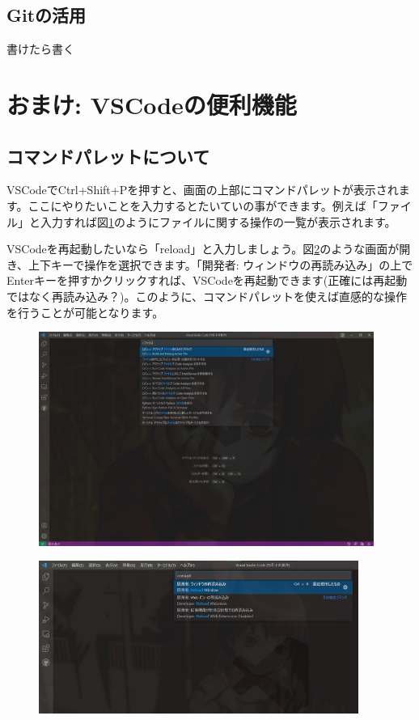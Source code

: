 \subsection{Gitの活用}
書けたら書く

\section{おまけ: VSCodeの便利機能}
\subsection{コマンドパレットについて}\label{ssec:cmp}
VSCodeでCtrl+Shift+Pを押すと、画面の上部にコマンドパレットが表示されます。ここにやりたいことを入力するとたいていの事ができます。例えば「ファイル」と入力すれば図\ref{fig:vscmp}のようにファイルに関する操作の一覧が表示されます。

VSCodeを再起動したいなら「reload」と入力しましょう。図\ref{fig:reload}のような画面が開き、上下キーで操作を選択できます。「開発者: ウィンドウの再読み込み」の上でEnterキーを押すかクリックすれば、VSCodeを再起動できます(正確には再起動ではなく再読み込み？)。このように、コマンドパレットを使えば直感的な操作を行うことが可能となります。
\begin{figure}[H]
    \centering
    \includegraphics[height=70mm]{img/vscmp.png}
    \caption{}
    \label{fig:vscmp}
\end{figure}

\begin{figure}[H]
    \centering
    \includegraphics[height=50mm]{img/reload.png}
    \caption{}
    \label{fig:reload}
\end{figure}

